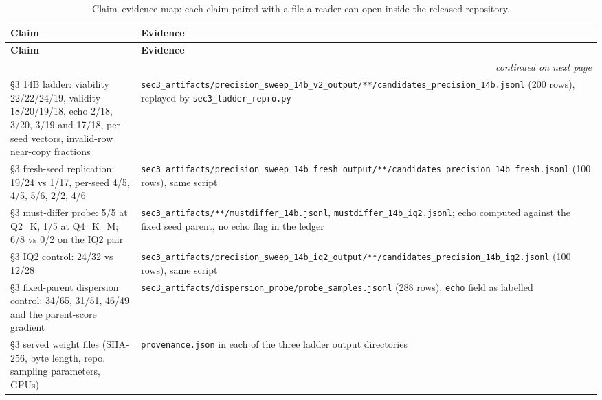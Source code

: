 \begingroup
\footnotesize
\begin{longtable}{@{}p{}p{}@{}}
\caption{Claim--evidence map: each claim paired with a file a reader can open
inside the released repository.}\\
\toprule
\textbf{Claim} & \textbf{Evidence} \\
\midrule
\endfirsthead
\toprule
\textbf{Claim} & \textbf{Evidence} \\
\midrule
\endhead
\midrule
\multicolumn{2}{r}{\emph{continued on next page}} \\
\endfoot
\bottomrule
\endlastfoot

\S3 14B ladder: viability 22/22/24/19, validity 18/20/19/18, echo 2/18, 3/20, 3/19 and 17/18, per-seed vectors, invalid-row near-copy fractions &
\texttt{sec3\_\bk{}artifacts/\bk{}precision\_\bk{}sweep\_\bk{}14b\_\bk{}v2\_\bk{}output/\bk{}**/\bk{}candidates\_\bk{}precision\_\bk{}14b.jsonl} (200 rows), replayed by \texttt{sec3\_ladder\_repro.py} \\

\S3 fresh-seed replication: 19/24 vs 1/17, per-seed 4/5, 4/5, 5/6, 2/2, 4/6 &
\texttt{sec3\_\bk{}artifacts/\bk{}precision\_\bk{}sweep\_\bk{}14b\_\bk{}fresh\_\bk{}output/\bk{}**/\bk{}candidates\_\bk{}precision\_\bk{}14b\_\bk{}fresh.jsonl} (100 rows), same script \\

\S3 must-differ probe: 5/5 at Q2\_K, 1/5 at Q4\_K\_M; 6/8 vs 0/2 on the IQ2 pair &
\texttt{sec3\_\bk{}artifacts/\bk{}**/\bk{}mustdiffer\_\bk{}14b.jsonl}, \texttt{mustdiffer\_14b\_iq2.jsonl}; echo computed against the fixed seed parent, no echo flag in the ledger \\

\S3 IQ2 control: 24/32 vs 12/28 &
\texttt{sec3\_\bk{}artifacts/\bk{}precision\_\bk{}sweep\_\bk{}14b\_\bk{}iq2\_\bk{}output/\bk{}**/\bk{}candidates\_\bk{}precision\_\bk{}14b\_\bk{}iq2.jsonl} (100 rows), same script \\

\S3 fixed-parent dispersion control: 34/65, 31/51, 46/49 and the parent-score gradient &
\texttt{sec3\_\bk{}artifacts/\bk{}dispersion\_\bk{}probe/\bk{}probe\_\bk{}samples.jsonl} (288 rows), \texttt{echo} field as labelled \\

\S3 served weight files (SHA-256, byte length, repo, sampling parameters, GPUs) &
\texttt{provenance.json} in each of the three ladder output directories \\


\end{longtable}
